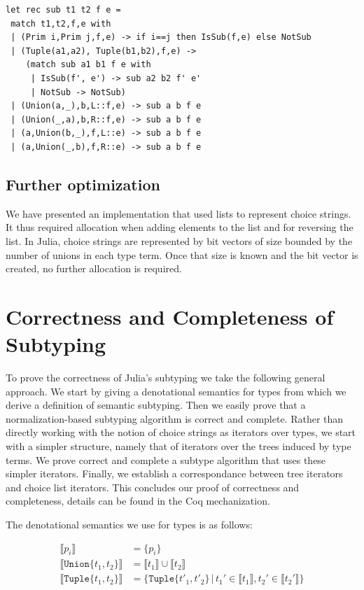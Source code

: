 \documentclass[a4paper,english]{lipics-v2019}
\newcommand{\xt}[1]{\texttt{#1}}
\newcommand{\tuplet}[2]{\xt{Tuple\{}#1,#2\xt{\}}}
\newcommand{\union}[2]{\xt{Union\{}#1,#2\xt{\}}}
\newcommand{\denotes}[1]{\llbracket #1 \rrbracket}
\begin{document}
\begin{lstlisting}
let rec sub t1 t2 f e =
 match t1,t2,f,e with 
 | (Prim i,Prim j,f,e) -> if i==j then IsSub(f,e) else NotSub
 | (Tuple(a1,a2), Tuple(b1,b2),f,e) ->
    (match sub a1 b1 f e with
     | IsSub(f', e') -> sub a2 b2 f' e'
     | NotSub -> NotSub)
 | (Union(a,_),b,L::f,e) -> sub a b f e
 | (Union(_,a),b,R::f,e) -> sub a b f e
 | (a,Union(b,_),f,L::e) -> sub a b f e
 | (a,Union(_,b),f,R::e) -> sub a b f e
\end{lstlisting}

\subsection{Further optimization}

We have presented an implementation that used lists to represent choice
strings. It thus required allocation when adding elements to the list and
for reversing the list. In Julia, choice strings are represented by bit
vectors of size bounded by the number of unions in each type term.  Once
that size is known and the bit vector is created, no further allocation is
required.

\section{Correctness and Completeness of Subtyping}

To prove the correctness of Julia's subtyping we take the following general
approach. We start by giving a denotational semantics for types from which
we derive a definition of semantic subtyping. Then we easily prove that a
normalization-based subtyping algorithm is correct and complete. Rather than
directly working with the notion of choice strings as iterators over types,
we start with a simpler structure, namely that of iterators over the trees
induced by type terms. We prove correct and complete a subtype algorithm
that uses these simpler iterators. Finally, we establish a correspondance
between tree iterators and choice list iterators. This concludes our proof
of correctness and completeness, details can be found in the Coq
mechanization.

The denotational semantics we use for types is as follows:

\vspace{-5mm}
\begin{align*}
\denotes{p_i} &= \{p_i\} \\
\denotes{\union{t_1}{t_2}} &= \denotes{t_1} \cup \denotes{t_2} \\
\denotes{\tuplet{t_1}{t_2}} &= \{\tuplet{t'_1}{t'_2} \,|\, t_1' \in \denotes{t_1},  t_2' \in \denotes{t_2'}\}
\end{align*}
\vspace{-5mm}
\end{document}
